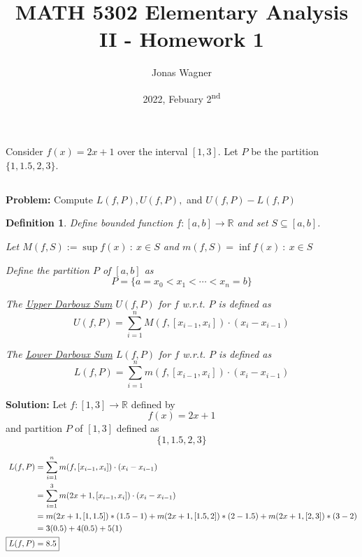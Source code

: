 \documentclass[]{article}
\title{MATH 5302 Elementary Analysis II - Homework 1}
\author{Jonas Wagner}
\date{2022, Febuary 2\textsuperscript{nd}}
\newcommand{\R}{\mathbb{R}}
\newcommand{\st}{\ : \ }
\newtheorem{definition}{Definition}
\begin{document}
\maketitle

\section{}
Consider $f(x) = 2x + 1$ over the interval $[1,3]$.
Let $P$ be the partition $\{1,1.5,2,3\}$.

\subsection{}
\textbf{Problem:}
Compute $L(f,P), U(f,P),$ and $U(f,P) - L(f,P)$

\begin{definition}\label{def:darboux_sum}
    Define bounded function $f : [a,b] \to \R$ and set $S \subseteq [a,b]$.

    Let $M(f,S) := \sup{f(x) \st x \in S}$ and $m(f,S) = \inf{f(x) \st x \in S}$

    Define the partition $P$ of $[a,b]$ as\[
        P = \{a = x_0 < x_1 < \cdots < x_n = b\}
    \]

    The \underline{\emph{Upper Darboux Sum}} $U(f,P)$ for $f$ w.r.t. $P$ is defined as\[
        U(f,P) = \sum_{i=1}^{n} M(f,[x_{i-1},x_i]) \cdot (x_i - x_{i-1})
    \]

    The \underline{\emph{Lower Darboux Sum}} $L(f,P)$ for $f$ w.r.t. $P$ is defined as\[
        L(f,P) = \sum_{i=1}^{n} m(f,[x_{i-1},x_i]) \cdot (x_i - x_{i-1})
    \]
\end{definition}

\textbf{Solution:}
Let $f: [1, 3] \to \R$ defined by \[
    f(x) = 2x + 1
\] and partition $P$ of $[1,3]$ defined as \[
    \{1,1.5,2,3\}
\]

\begin{align*}
    L(f,P) &= \sum_{i=1}^{n} m(f,[x_{i-1},x_i]) \cdot (x_i - x_{i-1})\\
        &= \sum_{i=1}^{3} m(2 x + 1,[x_{i-1},x_i]) \cdot (x_i - x_{i-1})\\
        &= m(2x + 1, [1, 1.5]) * (1.5 - 1)
            + m(2x + 1, [1.5, 2]) * (2 - 1.5)
            + m(2x + 1, [2, 3]) * (3 - 2)\\
        &= 3 (0.5) 
            + 4 (0.5)
            + 5 (1)\\
    \Aboxed{L(f,P) &= 8.5}
\end{align*}
\end{document}
